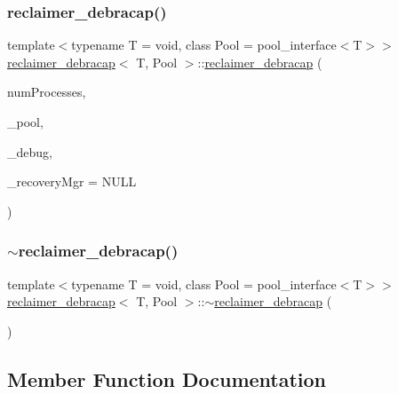 \subsubsection{\texorpdfstring{reclaimer\+\_\+debracap()}{reclaimer\_debracap()}}
{\footnotesize\ttfamily template$<$typename T  = void, class Pool  = pool\+\_\+interface$<$\+T$>$$>$ \\
\hyperlink{classreclaimer__debracap}{reclaimer\+\_\+debracap}$<$ T, Pool $>$\+::\hyperlink{classreclaimer__debracap}{reclaimer\+\_\+debracap} (\begin{DoxyParamCaption}\item[{const int}]{num\+Processes,  }\item[{Pool $\ast$}]{\+\_\+pool,  }\item[{\hyperlink{classdebugInfo}{debug\+Info} $\ast$const}]{\+\_\+debug,  }\item[{\hyperlink{classRecoveryMgr}{Recovery\+Mgr}$<$ void $\ast$$>$ $\ast$const}]{\+\_\+recovery\+Mgr = {\ttfamily NULL} }\end{DoxyParamCaption})\hspace{0.3cm}{\ttfamily [inline]}}

\mbox{\label{classreclaimer__debracap_a9a4d64ab713bce63d26ce2e4e97302b7}} 
\subsubsection{\texorpdfstring{$\sim$reclaimer\+\_\+debracap()}{~reclaimer\_debracap()}}
{\footnotesize\ttfamily template$<$typename T  = void, class Pool  = pool\+\_\+interface$<$\+T$>$$>$ \\
\hyperlink{classreclaimer__debracap}{reclaimer\+\_\+debracap}$<$ T, Pool $>$\+::$\sim$\hyperlink{classreclaimer__debracap}{reclaimer\+\_\+debracap} (\begin{DoxyParamCaption}{ }\end{DoxyParamCaption})\hspace{0.3cm}{\ttfamily [inline]}}



\subsection{Member Function Documentation}
\mbox{\label{classreclaimer__debracap_a42e33db09c07092c58669f718a6d6776}} 
